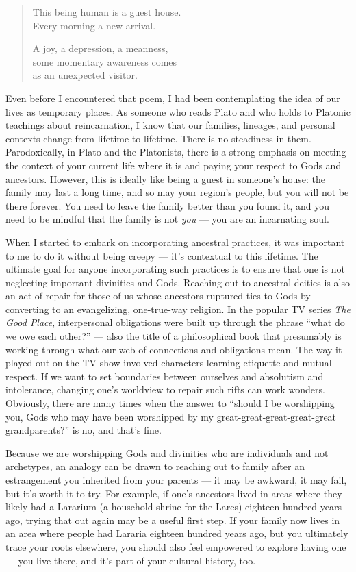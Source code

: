 \documentclass[
]{book}
\begin{document}
\begin{quote}
This being human is a guest house.\\
Every morning a new arrival.

A joy, a depression, a meanness,\\
some momentary awareness comes\\
as an unexpected visitor.
\end{quote}

Even before I encountered that poem, I had been contemplating the idea of our lives as temporary places. As someone who reads Plato and who holds to Platonic teachings about reincarnation, I know that our families, lineages, and personal contexts change from lifetime to lifetime. There is no steadiness in them. Parodoxically, in Plato and the Platonists, there is a strong emphasis on meeting the context of your current life where it is and paying your respect to Gods and ancestors. However, this is ideally like being a guest in someone's house: the family may last a long time, and so may your region's people, but you will not be there forever. You need to leave the family better than you found it, and you need to be mindful that the family is not \emph{you} --- you are an incarnating soul.

When I started to embark on incorporating ancestral practices, it was important to me to do it without being creepy --- it's contextual to this lifetime. The ultimate goal for anyone incorporating such practices is to ensure that one is not neglecting important divinities and Gods. Reaching out to ancestral deities is also an act of repair for those of us whose ancestors ruptured ties to Gods by converting to an evangelizing, one-true-way religion. In the popular TV series \emph{The Good Place}, interpersonal obligations were built up through the phrase ``what do we owe each other?'' --- also the title of a philosophical book that presumably is working through what our web of connections and obligations mean. The way it played out on the TV show involved characters learning etiquette and mutual respect. If we want to set boundaries between ourselves and absolutism and intolerance, changing one's worldview to repair such rifts can work wonders. Obviously, there are many times when the answer to ``should I be worshipping you, Gods who may have been worshipped by my great-great-great-great-great grandparents?'' is no, and that's fine.

Because we are worshipping Gods and divinities who are individuals and not archetypes, an analogy can be drawn to reaching out to family after an estrangement you inherited from your parents --- it may be awkward, it may fail, but it's worth it to try. For example, if one's ancestors lived in areas where they likely had a Lararium (a household shrine for the Lares) eighteen hundred years ago, trying that out again may be a useful first step. If your family now lives in an area where people had Lararia eighteen hundred years ago, but you ultimately trace your roots elsewhere, you should also feel empowered to explore having one --- you live there, and it's part of your cultural history, too.
\end{document}
